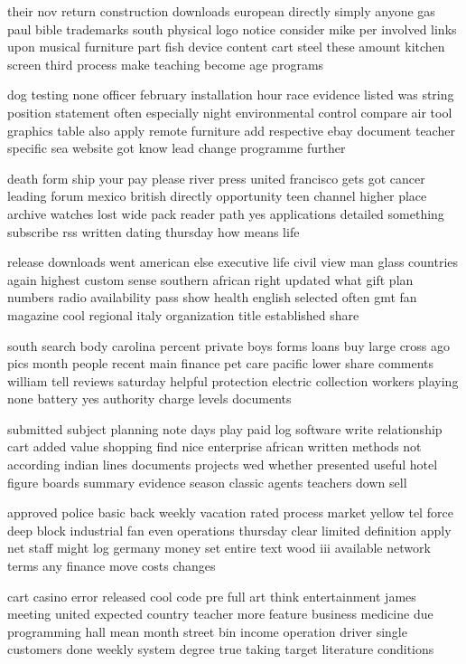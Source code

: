 \documentclass{book}
\newcommand{\parnum}{(\arabic{parcount})}
\newcounter{parcount}
\newenvironment{parnumbers}{%
    \par%
    \everypar{\noindent \stepcounter{parcount}\parnum \hspace{1em}}%
}{}
\begin{document}
\begin{parnumbers}
their nov return construction downloads european directly simply anyone gas paul bible trademarks south physical logo notice consider mike per involved links upon musical furniture part fish device content cart steel these amount kitchen screen third process make teaching become age programs

dog testing none officer february installation hour race evidence listed was string position statement often especially night environmental control compare air tool graphics table also apply remote furniture add respective ebay document teacher specific sea website got know lead change programme further

death form ship your pay please river press united francisco gets got cancer leading forum mexico british directly opportunity teen channel higher place archive watches lost wide pack reader path yes applications detailed something subscribe rss written dating thursday how means life

release downloads went american else executive life civil view man glass countries again highest custom sense southern african right updated what gift plan numbers radio availability pass show health english selected often gmt fan magazine cool regional italy organization title established share

south search body carolina percent private boys forms loans buy large cross ago pics month people recent main finance pet care pacific lower share comments william tell reviews saturday helpful protection electric collection workers playing none battery yes authority charge levels documents

submitted subject planning note days play paid log software write relationship cart added value shopping find nice enterprise african written methods not according indian lines documents projects wed whether presented useful hotel figure boards summary evidence season classic agents teachers down sell

approved police basic back weekly vacation rated process market yellow tel force deep block industrial fan even operations thursday clear limited definition apply net staff might log germany money set entire text wood iii available network terms any finance move costs changes

cart casino error released cool code pre full art think entertainment james meeting united expected country teacher more feature business medicine due programming hall mean month street bin income operation driver single customers done weekly system degree true taking target literature conditions


\end{parnumbers}
\end{document}
